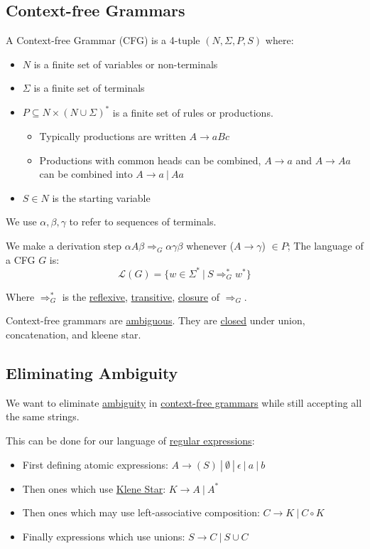 \documentclass{article}
\begin{document}
\subsection{Context-free Grammars}\label{cfg}
A Context-free Grammar (CFG) is a 4-tuple $(N, \Sigma, P, S)$ where:
\begin{itemize}
    \item $N$ is a finite set of variables or non-terminals
    \item $\Sigma$ is a finite set of terminals
    \item $P \subseteq N \times (N \cup \Sigma)^*$ is a finite set of rules or productions.
    \begin{itemize}
        \item Typically productions are written $A \to aBc$
        \item Productions with common heads can be combined, $A \to a$ and $A \to Aa$ can be combined into $A \to a \:|\: Aa$
    \end{itemize}
    \item  $S \in N$ is the starting variable
\end{itemize}

We use $\alpha, \beta, \gamma$ to refer to sequences of terminals.

We make a derivation step $\alpha A \beta \Rightarrow_G \alpha \gamma \beta$ whenever ($A \to \gamma$) $\in P$; The language of a CFG $G$ is:
\[\mathcal{L}(G)=\{w \in \Sigma^* \:|\: S \Rightarrow_G^* w^*\}\]

Where $\Rightarrow_G^*$ is the \hyperref[reflexive]{reflexive}, \hyperref[transitive]{transitive}, \hyperref[closure]{closure} of $\Rightarrow_G$.

Context-free grammars are \hyperref[ambiguity]{ambiguous}. They are \hyperref[closure]{closed} under union, concatenation, and kleene star.


\subsection{Eliminating Ambiguity}
We want to eliminate \hyperref[ambiguity]{ambiguity} in \hyperref[cfg]{context-free grammars} while still accepting all the same strings.

This can be done for our language of \hyperref[regex]{regular expressions}:
\begin{itemize}
    \item First defining atomic expressions: $A \to (S) \:|\:\emptyset \:|\:\epsilon \: | \: a \: | \: b$
    \item Then ones which use \hyperref[kleene-star]{Klene Star}: $K \to A \:|\: A^*$
    \item Then ones which may use left-associative composition: $C \to K \:|\: C \circ K$
    \item Finally expressions which use unions: $S \to C \:|\: S \cup C$
\end{itemize}
\end{document}
